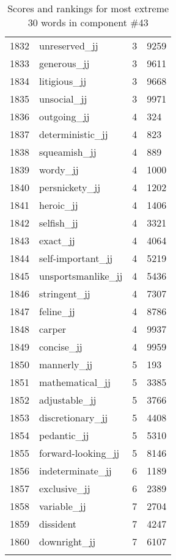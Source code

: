 \begin{longtable}[!htbp]{| rlr@{.}l |}
    1832 & unreserved\_jj & 3 & 9259 \\
    1833 & generous\_jj & 3 & 9611 \\
    1834 & litigious\_jj & 3 & 9668 \\
    1835 & unsocial\_jj & 3 & 9971 \\
    1836 & outgoing\_jj & 4 & 324 \\
    1837 & deterministic\_jj & 4 & 823 \\
    1838 & squeamish\_jj & 4 & 889 \\
    1839 & wordy\_jj & 4 & 1000 \\
    1840 & persnickety\_jj & 4 & 1202 \\
    1841 & heroic\_jj & 4 & 1406 \\
    1842 & selfish\_jj & 4 & 3321 \\
    1843 & exact\_jj & 4 & 4064 \\
    1844 & self-important\_jj & 4 & 5219 \\
    1845 & unsportsmanlike\_jj & 4 & 5436 \\
    1846 & stringent\_jj & 4 & 7307 \\
    1847 & feline\_jj & 4 & 8786 \\
    1848 & carper & 4 & 9937 \\
    1849 & concise\_jj & 4 & 9959 \\
    1850 & mannerly\_jj & 5 & 193 \\
    1851 & mathematical\_jj & 5 & 3385 \\
    1852 & adjustable\_jj & 5 & 3766 \\
    1853 & discretionary\_jj & 5 & 4408 \\
    1854 & pedantic\_jj & 5 & 5310 \\
    1855 & forward-looking\_jj & 5 & 8146 \\
    1856 & indeterminate\_jj & 6 & 1189 \\
    1857 & exclusive\_jj & 6 & 2389 \\
    1858 & variable\_jj & 7 & 2704 \\
    1859 & dissident & 7 & 4247 \\
    1860 & downright\_jj & 7 & 6107 \\
    \hline
    \caption{Scores and rankings for most extreme 30 words in component \#43} \\
\end{longtable}
